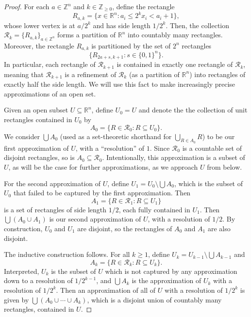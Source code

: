 \documentclass[12pt]{article}
\newcommand{\Z}{\mathbb{Z}}
\newcommand{\R}{\mathbb{R}}
\newcommand{\<}{\langle}
\renewcommand{\>}{\rangle}
\newcommand{\RR}{\mathcal{R}}
\begin{document}
\begin{proof}
    For each $a \in \Z^n$ and $k \in \Z_{\geq 0}$, define the rectangle
    \[
        R_{a,k} = \{x \in \R^n : a_i \leq 2^k x_i < a_i + 1\},
    \]
    whose lower vertex is at $a/2^k$ and has side length $1/2^k$. Then, the collection $\RR_k = \{R_{a,k}\}_{a \in \Z^n}$ forms a partition of $\R^n$ into countably many rectangles. Moreover, the rectangle $R_{a, k}$ is partitioned by the set of $2^n$ rectangles
    \[
        \{R_{2a+s, k+1} : s \in \{0, 1\}^n\}.
    \]
    In particular, each rectangle of $\RR_{k+1}$ is contained in exactly one rectangle of $\RR_k$, meaning that $\RR_{k+1}$ is a refinement of $\RR_k$ (as a partition of $\R^n$) into rectangles of exactly half the side length. We will use this fact to make increasingly precise approximations of an open set. 

    Given an open subset $U \subseteq \R^n$, define $U_0 = U$ and denote the the collection of unit rectangles contained in $U_0$ by
    \[
        A_0 = \{R \in \RR_0 : R \subseteq U_0\}.
    \]
    We consider $\bigcup A_0$ (used as a set-theoretic shorthand for $\bigcup_{R \in A_0} R$) to be our first approximation of $U$, with a ``resolution'' of $1$. Since $\RR_0$ is a countable set of disjoint rectangles, so is $A_0 \subseteq \RR_0$. Intentionally, this approximation is a subset of $U$, as will be the case for further approximations, as we approach $U$ from below.
    
    For the second approximation of $U$, define $U_1 = U_0 \setminus \bigcup A_0$, which is the subset of $U_0$ that failed to be captured by the first approximation. Then
    \[
        A_1 = \{R \in \RR_1 : R \subseteq U_1\}
    \]
    is a set of rectangles of side length $1/2$, each fully contained in $U_1$. Then $\bigcup(A_0 \cup A_1)$ is our second approximation of $U$, with a resolution of $1/2$. By construction, $U_0$ and $U_1$ are disjoint, so the rectangles of $A_0$ and $A_1$ are also disjoint.
    
    The inductive construction follows. For all $k \geq 1$, define $U_k = U_{k-1} \setminus \bigcup A_{k-1}$ and
    \[
        A_k = \{R \in \RR_k : R \subseteq U_k\}.
    \]
    Interpreted, $U_k$ is the subset of $U$ which is not captured by any approximation down to a resolution of $1/2^{k-1}$, and $\bigcup A_k$ is the approximation of $U_k$ with a resolution of $1/2^k$. Then an approximation of all of $U$ with a resolution of $1/2^k$ is given by $\bigcup(A_0 \cup \cdots \cup A_k)$, which is a disjoint union of countably many rectangles, contained in $U$. 
    

\end{proof}
\end{document}
